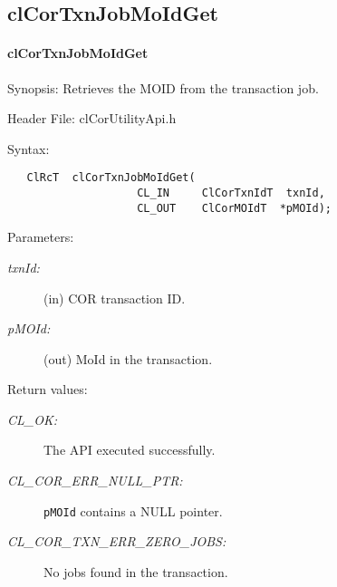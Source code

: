 \begin{flushleft}
\subsection{clCorTxnJobMoIdGet}
\hypertarget{pagecor202}{}\paragraph{cl\-Cor\-Txn\-Job\-MoId\-Get}\label{pagecor202}
\begin{Desc}
\item[Synopsis:] Retrieves the MOID from the transaction job.
\end{Desc}
\begin{Desc}
\item[Header File:]clCorUtilityApi.h\end{Desc}
\begin{Desc}
\item[Syntax:]

\footnotesize\begin{verbatim}   ClRcT  clCorTxnJobMoIdGet(
					CL_IN     ClCorTxnIdT  txnId,
					CL_OUT    ClCorMOIdT  *pMOId);
\end{verbatim}
\normalsize
\end{Desc}
\begin{Desc}
\item[Parameters:]
\begin{description}
\item[{\em txn\-Id:}](in) COR transaction ID.
\item[{\em p\-MOId:}](out) MoId in the transaction.
\end{description}
\end{Desc}
\begin{Desc}
\item[Return values:]
\begin{description}
\item[{\em CL\_\-OK:}]The API executed successfully. 
\item[{\em CL\_\-COR\_\-ERR\_\-NULL\_\-PTR:}] {\tt{pMOId}} contains a NULL pointer.
\item[{\em CL\_\-COR\_\-TXN\_\-ERR\_\-ZERO\_\-JOBS:}] No jobs found in the transaction.


\end{description}
\end{Desc}
\end{flushleft}
